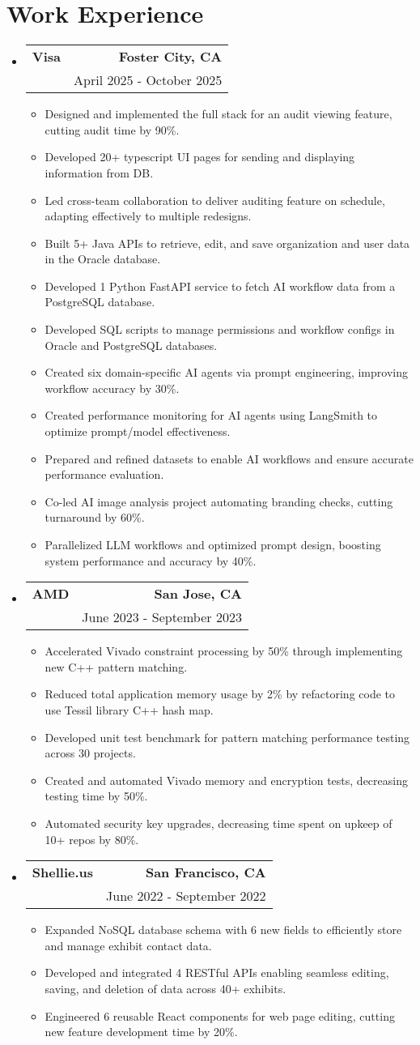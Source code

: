 \documentclass[letterpaper,11pt]{article}
\makeatletter
\newcommand{\resumeItem}[1]{
  \item\small{
    {#1 \vspace{-2pt}}
  }
}
\newcommand{\resumeSubheading}[4]{
  \vspace{-2pt}\item
    \begin{tabular*}{0.97\textwidth}[t]{l@{\extracolsep{\fill}}r}
      \textbf{#1} & #2 \\
      \text{#3} & #4 \\
    \end{tabular*}\vspace{-7pt}
}
\newcommand{\resumeSubHeadingListStart}{\begin{itemize}[leftmargin=0.15in, label={}]}
\newcommand{\resumeSubHeadingListEnd}{\end{itemize}}
\newcommand{\resumeItemListStart}{\begin{itemize}}
\newcommand{\resumeItemListEnd}{\end{itemize}\vspace{-5pt}}
\makeatother
\begin{document}
\section{\textbf{Work Experience}}
  \resumeSubHeadingListStart
    \resumeSubheading
    {Visa}{\textbf{Foster City, CA}}
    {Software Engineer, Java, JPA, Typescript, Python, SQL}{April 2025 - October 2025}
    \resumeItemListStart
        \resumeItem{Designed and implemented the full stack for an audit viewing feature, cutting audit time by 90\%.}
        \resumeItem{Developed 20+ typescript UI pages for sending and displaying information from DB.}
        \resumeItem{Led cross-team collaboration to deliver auditing feature on schedule, adapting effectively to multiple redesigns.}
        \resumeItem{Built 5+ Java APIs to retrieve, edit, and save organization and user data in the Oracle database.}
        \resumeItem{Developed 1 Python FastAPI service to fetch AI workflow data from a PostgreSQL database.}
        \resumeItem{Developed SQL scripts to manage permissions and workflow configs in Oracle and PostgreSQL databases.}
        \resumeItem{Created six domain-specific AI agents via prompt engineering, improving workflow accuracy by 30\%.}
        \resumeItem{Created performance monitoring for AI agents using LangSmith to optimize prompt/model effectiveness.}
        \resumeItem{Prepared and refined datasets to enable AI workflows and ensure accurate performance evaluation.}
        \resumeItem{Co-led AI image analysis project automating branding checks, cutting turnaround by 60\%.}        
        \resumeItem{Parallelized LLM workflows and optimized prompt design, boosting system performance and accuracy by 40\%.}
    \resumeItemListEnd
    \resumeSubheading
    {AMD}{\textbf{San Jose, CA}}
    {Backend Software Engineer Intern, C++, Python}{June 2023 - September 2023}
    \resumeItemListStart
        \resumeItem{Accelerated Vivado constraint processing by 50\% through implementing new C++ pattern matching.}
        \resumeItem{Reduced total application memory usage by 2\% by refactoring code to use Tessil library C++ hash map.}
        \resumeItem{Developed unit test benchmark for pattern matching performance testing across 30 projects.}
        \resumeItem{Created and automated Vivado memory and encryption tests, decreasing testing time by 50\%.}
        \resumeItem{Automated security key upgrades, decreasing time spent on upkeep of 10+ repos by 80\%.}
    \resumeItemListEnd
    \resumeSubheading
    {Shellie.us}{\textbf{San Francisco, CA}}
    {Software Engineer Intern, React, JavaScript, NoSQL, JSON}{June 2022 - September 2022}
    \resumeItemListStart
        \resumeItem{Expanded NoSQL database schema with 6 new fields to efficiently store and manage exhibit contact data.}
        \resumeItem{Developed and integrated 4 RESTful APIs enabling seamless editing, saving, and deletion of data across 40+ exhibits.}
        \resumeItem{Engineered 6 reusable React components for web page editing, cutting new feature development time by 20\%.}
    \resumeItemListEnd
  \resumeSubHeadingListEnd
\end{document}
